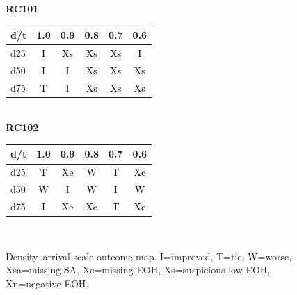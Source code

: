 \begin{figure}[p]
\centering
\caption{Density--arrival-scale outcome map. I=improved, T=tie, W=worse, Xsa=missing SA, Xe=missing EOH, Xs=suspicious low EOH, Xn=negative EOH.}
\label{fig:status-heatmap}
\scriptsize
\textbf{RC101}\\[-0.4em]
\begin{tabular}{lccccc}
\toprule
d/t & 1.0 & 0.9 & 0.8 & 0.7 & 0.6 \\
\midrule
d25 & \cellcolor{improvedGreen}\textcolor{black}{I} & \cellcolor{excludedPurple}\textcolor{black}{Xs} & \cellcolor{excludedPurple}\textcolor{black}{Xs} & \cellcolor{excludedPurple}\textcolor{black}{Xs} & \cellcolor{improvedGreen}\textcolor{black}{I} \\
d50 & \cellcolor{improvedGreen}\textcolor{black}{I} & \cellcolor{improvedGreen}\textcolor{black}{I} & \cellcolor{excludedPurple}\textcolor{black}{Xs} & \cellcolor{excludedPurple}\textcolor{black}{Xs} & \cellcolor{excludedPurple}\textcolor{black}{Xs} \\
d75 & \cellcolor{tieGray}\textcolor{black}{T} & \cellcolor{improvedGreen}\textcolor{black}{I} & \cellcolor{excludedPurple}\textcolor{black}{Xs} & \cellcolor{excludedPurple}\textcolor{black}{Xs} & \cellcolor{excludedPurple}\textcolor{black}{Xs} \\
\bottomrule
\end{tabular}\\[0.8em]
\textbf{RC102}\\[-0.4em]
\begin{tabular}{lccccc}
\toprule
d/t & 1.0 & 0.9 & 0.8 & 0.7 & 0.6 \\
\midrule
d25 & \cellcolor{tieGray}\textcolor{black}{T} & \cellcolor{excludedBrown}\textcolor{black}{Xe} & \cellcolor{worseRed}\textcolor{black}{W} & \cellcolor{tieGray}\textcolor{black}{T} & \cellcolor{excludedBrown}\textcolor{black}{Xe} \\
d50 & \cellcolor{worseRed}\textcolor{black}{W} & \cellcolor{improvedGreen}\textcolor{black}{I} & \cellcolor{worseRed}\textcolor{black}{W} & \cellcolor{improvedGreen}\textcolor{black}{I} & \cellcolor{worseRed}\textcolor{black}{W} \\
d75 & \cellcolor{improvedGreen}\textcolor{black}{I} & \cellcolor{excludedBrown}\textcolor{black}{Xe} & \cellcolor{excludedBrown}\textcolor{black}{Xe} & \cellcolor{tieGray}\textcolor{black}{T} & \cellcolor{excludedBrown}\textcolor{black}{Xe} \\
\bottomrule
\end{tabular}\\[0.8em]

\end{figure}
